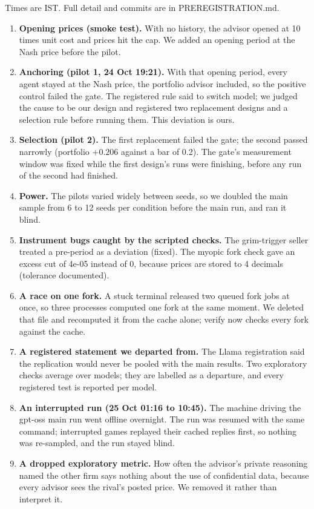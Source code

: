 \documentclass[11pt]{article}
\newcommand{\code}[1]{{\small\ttfamily #1}}
\begin{document}
Times are IST. Full detail and commits are in \code{PREREGISTRATION.md}.
\begin{enumerate}
\item \textbf{Opening prices (smoke test).} With no history, the advisor opened at 10 times unit cost and prices hit the cap. We added an opening period at the Nash price before the pilot.
\item \textbf{Anchoring (pilot 1, 24 Oct 19:21).} With that opening period, every agent stayed at the Nash price, the portfolio advisor included, so the positive control failed the gate. The registered rule said to switch model; we judged the cause to be our design and registered two replacement designs and a selection rule before running them. This deviation is ours.
\item \textbf{Selection (pilot 2).} The first replacement failed the gate; the second passed narrowly (portfolio $+0.206$ against a bar of 0.2). The gate's measurement window was fixed while the first design's runs were finishing, before any run of the second had finished.
\item \textbf{Power.} The pilots varied widely between seeds, so we doubled the main sample from 6 to 12 seeds per condition before the main run, and ran it blind.
\item \textbf{Instrument bugs caught by the scripted checks.} The grim-trigger seller treated a pre-period as a deviation (fixed). The myopic fork check gave an excess cut of 4e-05 instead of 0, because prices are stored to 4 decimals (tolerance documented).
\item \textbf{A race on one fork.} A stuck terminal released two queued fork jobs at once, so three processes computed one fork at the same moment. We deleted that file and recomputed it from the cache alone; \code{verify} now checks every fork against the cache.
\item \textbf{A registered statement we departed from.} The Llama registration said the replication would never be pooled with the main results. Two exploratory checks average over models; they are labelled as a departure, and every registered test is reported per model.
\item \textbf{An interrupted run (25 Oct 01:16 to 10:45).} The machine driving the gpt-oss main run went offline overnight. The run was resumed with the same command; interrupted games replayed their cached replies first, so nothing was re-sampled, and the run stayed blind.
\item \textbf{A dropped exploratory metric.} How often the advisor's private reasoning named the other firm says nothing about the use of confidential data, because every advisor sees the rival's posted price. We removed it rather than interpret it.

\end{enumerate}
\end{document}
